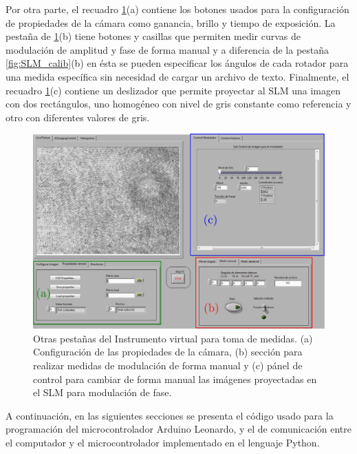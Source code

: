 Por otra parte, el recuadro \ref{fig:SLM_calib2}(a) contiene los
botones usados para la configuración de propiedades de la cámara como
ganancia, brillo y tiempo de exposición. La pestaña de
\ref{fig:SLM_calib2}(b) tiene botones y casillas que permiten medir
curvas de modulación de amplitud y fase de forma manual y a diferencia
de la pestaña \ref{fig:SLM_calib}(b) en ésta se pueden especificar los
ángulos de cada rotador para una medida específica sin necesidad de
cargar un archivo de texto. Finalmente, el recuadro
\ref{fig:SLM_calib2}(c) contiene un deslizador que permite proyectar
al SLM una imagen con dos rectángulos, uno homogéneo con nivel de gris constante como
referencia y otro con diferentes valores de gris.  
\begin{figure}[h!]
\centering
\includegraphics[scale = .4]{SLM_calib2.pdf} 
\caption[Interfaz del programa para toma de medidas 1.]{Otras pestañas
  del Instrumento virtual para toma de medidas. (a) Configuración de
  las propiedades de la cámara, (b) sección para realizar medidas de
  modulación de forma manual y (c) pánel de control para cambiar de
  forma manual las imágenes proyectadas en el SLM para modulación de fase.}
\label{fig:SLM_calib2}
\end{figure}

A continuación, en las siguientes secciones se presenta el código
usado para la programación del microcontrolador Arduino Leonardo, y el
de comunicación entre el computador y el microcontrolador implementado
en el lenguaje Python.
\pagebreak
